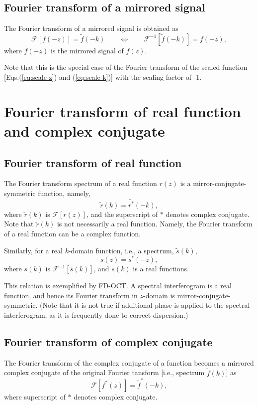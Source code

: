 \documentclass[a4paper]{article}
\newcommand{\ftf}[1]{{\mathcal{F}\left[#1\right]\xspace}}
\newcommand{\iftf}[1]{{\mathcal{F}^{-1}\left[#1\right]\xspace}}
\newcommand{\ftt}[1]{{\tilde{#1}\xspace}}
\begin{document}
\subsection{Fourier transform of a mirrored signal}
The Fourier transform of a mirrored signal is obtained as
\begin{equation}
	\ftf{ f(-z) } = \ftt{f} (-k) 
	\qquad \Leftrightarrow \qquad
	\iftf{ \ftt{f}(-k) } = f(-z),
\end{equation}
where $f(-z)$ is the mirrored signal of $f(z)$.

Note that this is the special case of the Fourier transform of the scaled function [Eqs.\@ (\ref{eq:scale-z}) and (\ref{eq:scale-k})] with the scaling factor of -1.

\section{Fourier transform of real function and complex conjugate}
\subsection{Fourier transform of real function}
The Fourier transform spectrum of a real function $r(z)$ is a mirror-conjugate-symmetric function, namely,
\begin{equation}
	\ftt{r}(k) = \ftt{r^*}(-k),
\end{equation}
where $\ftt{r}(k)$ is $\ftf{r(z)}$, and the superscript of $*$ denotes complex conjugate.
Note that $\ftt{r}(k)$ is not necessarily a real function.
Namely, the Fourier transform of a real function can be a complex function.

Similarly, for a real $k$-domain function, i.e., a spectrum, $\ftt{s}(k)$,
\begin{equation}
	s(z) = s^*(-z),
\end{equation}
where $s(k)$ is $\iftf{\ftt{s}(k)}$, and $s(k)$ is a real functions.

This relation is exemplified by FD-OCT.
A spectral interferogram is a real function, and hence its Fourier transform in $z$-domain is mirror-conjugate-symmetric.
(Note that it is not true if additional phase is applied to the spectral interferogram, as it is frequently done to correct dispersion.)

\subsection{Fourier transform of complex conjugate}
The Fourier transform of the complex conjugate of a function becomes a mirrored complex conjugate of the original Fourier tansform [i.e., spectrum $\ftt{f}(k)$] as
\begin{equation}
	\ftf{f^*(z)} = \ftt{f}^*(-k),
\end{equation}
where superscript of $*$ denotes complex conjugate.
\end{document}
